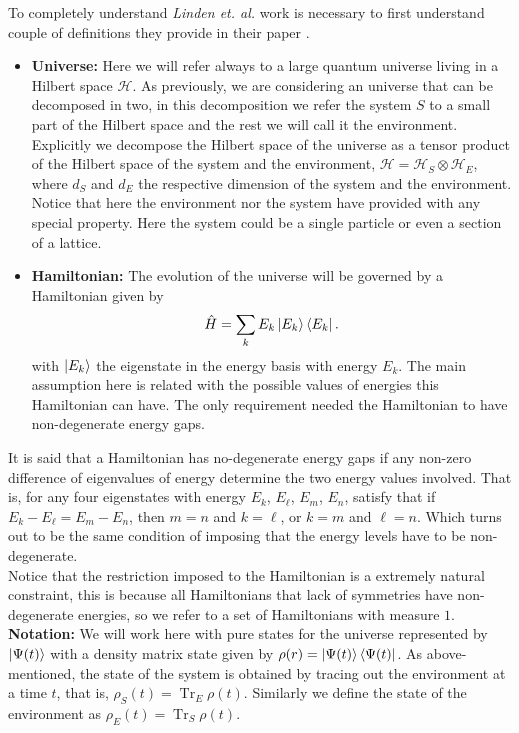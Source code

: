 \indent To completely understand \textit{Linden et. al.} work is necessary to first understand couple of definitions they provide in their paper  \cite{linden_quantum_2009}.\\
\begin{itemize}
\item \textbf{Universe:} Here we will refer always to a large quantum universe living in a Hilbert space $\mathcal{H}$. As previously, we are considering an universe that can be decomposed in two, in this decomposition we refer the system $S$ to a small part of the Hilbert space and the rest we will call it the environment. Explicitly we decompose the Hilbert space of the universe as a tensor product of the Hilbert space of the system and the environment, $\mathcal{H}=\mathcal{H}_S\otimes \mathcal{H}_E$, where $d_S$ and $d_E$ the respective dimension of the system and the environment. Notice that here the environment nor the system have provided with any special property. Here the system could be a single particle or even a section of a lattice.
\item \textbf{Hamiltonian:} The evolution of the universe will be governed by a Hamiltonian given by
\begin{equation}
\hat{H}=\sum_{k}E_k\mathinner{|{E_k}\rangle}\mathinner{\langle{E_k}|}.
\label{CH1:Hamiltonian_universe_linden}
\end{equation}
with $\mathinner{|{E_k}\rangle}$ the eigenstate in the energy basis with energy $E_k$. The main assumption here is related with the possible values of energies this Hamiltonian can have. The only requirement needed the Hamiltonian to have non-degenerate energy gaps.
\end{itemize}

It is said that a Hamiltonian has no-degenerate energy gaps if any non-zero difference of eigenvalues of energy determine the two energy values involved. That is, for any four eigenstates with energy $E_k$, $E_\ell$, $E_m$, $E_n$, satisfy that if $E_{k}-E_{\ell}=E_{m}-E_{n}$, then $m=n$ and $k=\ell$, or $k=m$ and $\ell = n$. Which turns out to be the same condition of imposing that the energy levels have to be non-degenerate.\\

\indent Notice that the restriction imposed to the Hamiltonian is a extremely natural constraint, this is because all Hamiltonians that lack of symmetries have non-degenerate energies, so we refer to a set of Hamiltonians with measure $1$.\\

\indent \textbf{Notation:} We will work here with pure states for the universe represented by $\mathinner{|{\Psi(t)}\rangle}$ with a density matrix state given by $\rho(r) =\mathinner{|{\Psi(t)}\rangle}\mathinner{\langle{\Psi(t)}|}$. As above-mentioned, the state of the system is obtained by tracing out the environment at a time $t$, that is, $\rho_S(t)=\operatorname{Tr}_E \rho(t)$. Similarly we define the state of the environment as $\rho_E(t)=\operatorname{Tr}_S \rho(t)$.\\

